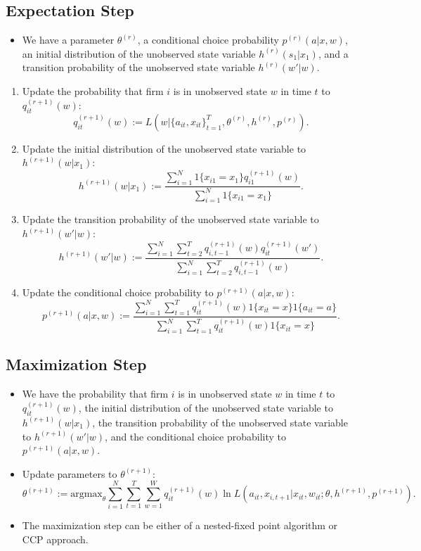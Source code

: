 \documentclass[
]{book}
\providecommand{\tightlist}{%
  \setlength{\itemsep}{0pt}\setlength{\parskip}{0pt}}
\begin{document}
\hypertarget{expectation-step}{%
\subsection{Expectation Step}\label{expectation-step}}

\begin{itemize}
\tightlist
\item
  We have a parameter \(\theta^{(r)}\), a conditional choice probability \(p^{(r)}(a|x, w)\), an initial distribution of the unobserved state variable \(h^{(r)}(s_1|x_1)\), and a transition probability of the unobserved state variable \(h^{(r)}(w'|w)\).
\end{itemize}

\begin{enumerate}
\def\labelenumi{\arabic{enumi}.}
\tightlist
\item
  Update the probability that firm \(i\) is in unobserved state \(w\) in time \(t\) to \(q_{it}^{(r + 1)}(w)\):
  \[
  q_{it}^{(r + 1)}(w) := L(w|\{a_{it}, x_{it}\}_{t = 1}^T, \theta^{(r)}, h^{(r)}, p^{(r)}).
  \]
\item
  Update the initial distribution of the unobserved state variable to \(h^{(r + 1)}(w|x_1)\):
  \[
  h^{(r + 1)}(w|x_1) := \frac{\sum_{i = 1}^N 1\{x_{i1} = x_1\} q_{i1}^{(r + 1)}(w)}{\sum_{i = 1}^N 1\{x_{i1} = x_1\}}.
  \]
\item
  Update the transition probability of the unobserved state variable to \(h^{(r + 1)}(w'|w)\):
  \[
  h^{(r + 1)}(w'|w) := \frac{\sum_{i = 1}^N \sum_{t = 2}^T q_{i, t - 1}^{(r + 1)}(w) q_{it}^{(r + 1)}(w')}{\sum_{i = 1}^N \sum_{t = 2}^T q_{i, t - 1}^{(r + 1)}(w)}.
  \]
\item
  Update the conditional choice probability to \(p^{(r + 1)}(a|x, w)\):
  \[
  p^{(r + 1)}(a|x, w) := \frac{\sum_{i = 1}^N \sum_{t = 1}^T q_{it}^{(r + 1)}(w) 1\{x_{it} = x\}1\{a_{it} = a\}}{\sum_{i = 1}^N \sum_{t = 1}^T q_{it}^{(r + 1)}(w) 1\{x_{it} = x\}}.
  \]
\end{enumerate}

\hypertarget{maximization-step}{%
\subsection{Maximization Step}\label{maximization-step}}

\begin{itemize}
\tightlist
\item
  We have the probability that firm \(i\) is in unobserved state \(w\) in time \(t\) to \(q_{it}^{(r + 1)}(w)\), the initial distribution of the unobserved state variable to \(h^{(r + 1)}(w|x_1)\), the transition probability of the unobserved state variable to \(h^{(r + 1)}(w'|w)\), and the conditional choice probability to \(p^{(r + 1)}(a|x, w)\).
\item
  Update parameters to \(\theta^{(r + 1)}\):
  \[
  \theta^{(r + 1)} := \text{argmax}_{\theta} \sum_{i = 1}^N \sum_{t = 1}^T \sum_{w = 1}^W q_{it}^{(r + 1)}(w) \ln L(a_{it}, x_{i, t + 1}|x_{it}, w_{it}; \theta, h^{(r + 1)}, p^{(r + 1)}).
  \]
\item
  The maximization step can be either of a nested-fixed point algorithm or CCP approach.
\end{itemize}
\end{document}
